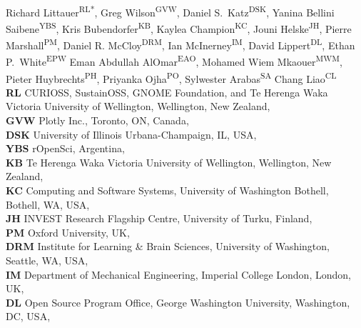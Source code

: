 \documentclass[10pt,letterpaper]{article}
\begin{document}
\vspace*{0.2in}

\begin{flushleft}
{\Large
\textbf{}
}
\newline
\\
Richard Littauer\textsuperscript{RL*},
Greg Wilson\textsuperscript{GVW},
Daniel S.\ Katz\textsuperscript{DSK},
Yanina Bellini Saibene\textsuperscript{YBS},
Kris Bubendorfer\textsuperscript{KB},
Kaylea Champion\textsuperscript{KC},
Jouni Helske\textsuperscript{JH},
Pierre Marshall\textsuperscript{PM},
Daniel R. McCloy\textsuperscript{DRM},
Ian McInerney\textsuperscript{IM},
David Lippert\textsuperscript{DL},
Ethan P.\ White\textsuperscript{EPW}
Eman Abdullah AlOmar\textsuperscript{EAO},
Mohamed Wiem Mkaouer\textsuperscript{MWM},
Pieter Huybrechts\textsuperscript{PH},
Priyanka Ojha\textsuperscript{PO},
Sylwester Arabas\textsuperscript{SA}
Chang Liao\textsuperscript{CL}
\\
\bigskip
\textbf{RL} CURIOSS, SustainOSS, GNOME Foundation, and Te Herenga Waka Victoria University of Wellington, Wellington, New Zealand, \\
\textbf{GVW} Plotly Inc., Toronto, ON, Canada, \\
\textbf{DSK} University of Illinois Urbana-Champaign, IL, USA, \\
\textbf{YBS} rOpenSci, Argentina, \\
\textbf{KB} Te Herenga Waka Victoria University of Wellington, Wellington, New Zealand, \\
\textbf{KC} Computing and Software Systems, University of Washington Bothell, Bothell, WA, USA, \\
\textbf{JH} INVEST Research Flagship Centre, University of Turku, Finland, \\
\textbf{PM} Oxford University, UK, \\
\textbf{DRM} Institute for Learning \& Brain Sciences, University of Washington, Seattle, WA, USA, \\
\textbf{IM} Department of Mechanical Engineering, Imperial College London, London, UK, \\
\textbf{DL} Open Source Program Office, George Washington University, Washington, DC, USA, \\

\end{flushleft}
\end{document}
